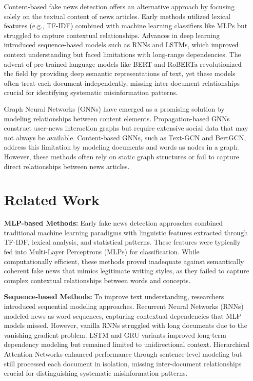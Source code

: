 \documentclass[conference]{IEEEtran}
\begin{document}
Content-based fake news detection offers an alternative approach by focusing solely on the textual content of news articles. Early methods utilized lexical features (e.g., TF-IDF) combined with machine learning classifiers like MLPs but struggled to capture contextual relationships. Advances in deep learning introduced sequence-based models such as RNNs and LSTMs, which improved context understanding but faced limitations with long-range dependencies. The advent of pre-trained language models like BERT and RoBERTa revolutionized the field by providing deep semantic representations of text, yet these models often treat each document independently, missing inter-document relationships crucial for identifying systematic misinformation patterns.

Graph Neural Networks (GNNs) have emerged as a promising solution by modeling relationships between content elements. Propagation-based GNNs construct user-news interaction graphs but require extensive social data that may not always be available. Content-based GNNs, such as Text-GCN and BertGCN, address this limitation by modeling documents and words as nodes in a graph. However, these methods often rely on static graph structures or fail to capture direct relationships between news articles.


\section{Related Work}
\label{sec:related}

\textbf{MLP-based Methods:} Early fake news detection approaches combined traditional machine learning paradigms with linguistic features extracted through TF-IDF, lexical analysis, and statistical patterns. These features were typically fed into Multi-Layer Perceptrons (MLPs) for classification. While computationally efficient, these methods proved inadequate against semantically coherent fake news that mimics legitimate writing styles, as they failed to capture complex contextual relationships between words and concepts.

\textbf{Sequence-based Methods:} To improve text understanding, researchers introduced sequential modeling approaches. Recurrent Neural Networks (RNNs) modeled news as word sequences, capturing contextual dependencies that MLP models missed. However, vanilla RNNs\cite{sherstinsky2020fundamentals} struggled with long documents due to the vanishing gradient problem. LSTM and GRU variants improved long-term dependency modeling but remained limited to unidirectional context. Hierarchical Attention Networks enhanced performance through sentence-level modeling but still processed each document in isolation, missing inter-document relationships crucial for distinguishing systematic misinformation patterns.
\end{document}
